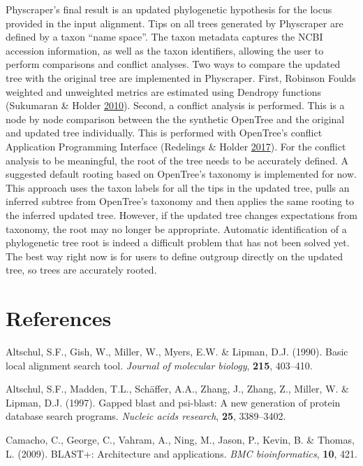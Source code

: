 \documentclass[]{article}
\begin{document}
Physcraper's final result is an updated phylogenetic hypothesis for the locus provided in the input alignment.
Tips on all trees generated by Physcraper are defined by a taxon ``name space''. The taxon metadata captures the NCBI accession information, as well as the taxon identifiers, allowing the user to perform comparisons and conflict analyses.
Two ways to compare the updated tree with the original tree are implemented in Physcraper. First, Robinson Foulds weighted and unweighted metrics are estimated using Dendropy functions (Sukumaran \& Holder \protect\hyperlink{ref-sukumaran2010dendropy}{2010}).
Second, a conflict analysis is performed. This is a node by node comparison between the the synthetic OpenTree and the original and updated tree individually. This is performed with OpenTree's conflict Application Programming Interface (Redelings \& Holder \protect\hyperlink{ref-redelings2017supertree}{2017}).
For the conflict analysis to be meaningful, the root of the tree needs to be accurately defined. A suggested default rooting based on OpenTree's taxonomy is implemented for now. This approach uses the taxon labels for all the tips in the updated tree, pulls an inferred subtree from OpenTree's taxonomy and then applies the same rooting to the inferred updated tree. However, if the updated tree changes expectations from taxonomy, the root may no longer be appropriate. Automatic identification of a phylogenetic tree root is indeed a difficult problem that has not been solved yet. The best way right now is for users to define outgroup directly on the updated tree, so trees are accurately rooted.

\hypertarget{references}{%
\section*{References}\label{references}}

\hypertarget{refs}{}
\leavevmode\hypertarget{ref-altschul1990basic}{}%
Altschul, S.F., Gish, W., Miller, W., Myers, E.W. \& Lipman, D.J. (1990). Basic local alignment search tool. \emph{Journal of molecular biology}, \textbf{215}, 403--410.

\leavevmode\hypertarget{ref-altschul1997gapped}{}%
Altschul, S.F., Madden, T.L., Schäffer, A.A., Zhang, J., Zhang, Z., Miller, W. \& Lipman, D.J. (1997). Gapped blast and psi-blast: A new generation of protein database search programs. \emph{Nucleic acids research}, \textbf{25}, 3389--3402.

\leavevmode\hypertarget{ref-camacho2009blast}{}%
Camacho, C., George, C., Vahram, A., Ning, M., Jason, P., Kevin, B. \& Thomas, L. (2009). BLAST+: Architecture and applications. \emph{BMC bioinformatics}, \textbf{10}, 421.
\end{document}
